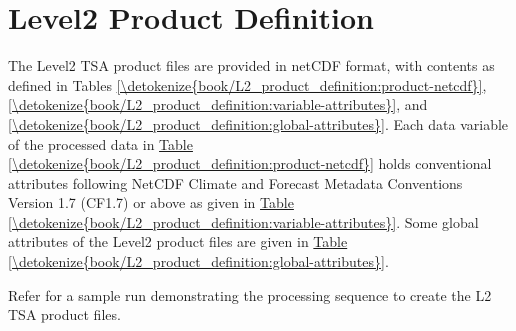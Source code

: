 \documentclass[letterpaper,10pt,english]{jupyterBook}
\begin{document}
\sphinxstepscope


\chapter{Level\sphinxhyphen{}2 Product Definition}
\label{\detokenize{book/L2_product_definition:level-2-product-definition}}\label{\detokenize{book/L2_product_definition::doc}}
\sphinxAtStartPar
The Level\sphinxhyphen{}2 TSA product files are provided in netCDF format, with contents as defined in Tables \hyperref[\detokenize{book/L2_product_definition:product-netcdf}]{\ref{\detokenize{book/L2_product_definition:product-netcdf}}}, \hyperref[\detokenize{book/L2_product_definition:variable-attributes}]{\ref{\detokenize{book/L2_product_definition:variable-attributes}}}, and \hyperref[\detokenize{book/L2_product_definition:global-attributes}]{\ref{\detokenize{book/L2_product_definition:global-attributes}}}.
Each data variable of the processed data in \hyperref[\detokenize{book/L2_product_definition:product-netcdf}]{Table \ref{\detokenize{book/L2_product_definition:product-netcdf}}} holds conventional attributes following NetCDF Climate and Forecast Metadata Conventions Version 1.7 (CF\sphinxhyphen{}1.7) or above as given in \hyperref[\detokenize{book/L2_product_definition:variable-attributes}]{Table \ref{\detokenize{book/L2_product_definition:variable-attributes}}}.
Some global attributes of the Level\sphinxhyphen{}2 product files are given in \hyperref[\detokenize{book/L2_product_definition:global-attributes}]{Table \ref{\detokenize{book/L2_product_definition:global-attributes}}}.


\nopagebreak


\sphinxAtStartPar
Refer  for a sample run demonstrating the processing sequence to create the L2 TSA product files.
\end{document}
